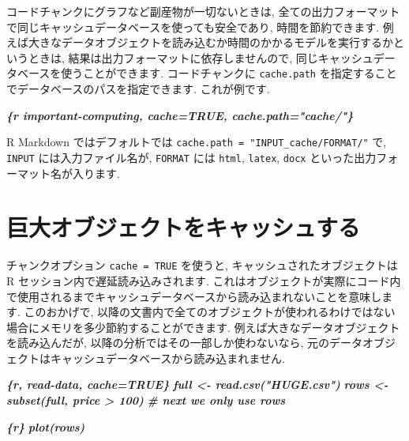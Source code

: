 \documentclass[
  11pt,
  lualatex,
  ja=standard]{bxjsreport}
\newenvironment{Shaded}{\begin{snugshade}}{\end{snugshade}}
\newcommand{\InformationTok}[1]{\textcolor[rgb]{0.56,0.35,0.01}{\textbf{\textit{#1}}}}
\begin{document}
コードチャンクにグラフなど副産物が一切ないときは, 全ての出力フォーマットで同じキャッシュデータベースを使っても安全であり, 時間を節約できます. 例えば大きなデータオブジェクトを読み込むか時間のかかるモデルを実行するかというときは, 結果は出力フォーマットに依存しませんので, 同じキャッシュデータベースを使うことができます. コードチャンクに \texttt{cache.path} を指定することでデータベースのパスを指定できます. これが例です.

\begin{Shaded}
\begin{Highlighting}[]
\InformationTok{\textasciigrave{}\textasciigrave{}\textasciigrave{}\{r important{-}computing, cache=TRUE, cache.path="cache/"\}}
\InformationTok{\textasciigrave{}\textasciigrave{}\textasciigrave{}}
\end{Highlighting}
\end{Shaded}

R Markdown ではデフォルトでは \texttt{cache.path = "INPUT\_cache/FORMAT/"} で, \texttt{INPUT} には入力ファイル名が, \texttt{FORMAT} には \texttt{html}, \texttt{latex}, \texttt{docx} といった出力フォーマット名が入ります.

\hypertarget{cache-lazy}{%
\section{巨大オブジェクトをキャッシュする}\label{cache-lazy}}

チャンクオプション \texttt{cache = TRUE} を使うと, キャッシュされたオブジェクトは R セッション内で遅延読み込みされます. これはオブジェクトが実際にコード内で使用されるまでキャッシュデータベースから読み込まれないことを意味します. このおかげで, 以降の文書内で全てのオブジェクトが使われるわけではない場合にメモリを多少節約することができます. 例えば大きなデータオブジェクトを読み込んだが, 以降の分析ではその一部しか使わないなら, 元のデータオブジェクトはキャッシュデータベースから読み込まれません.

\begin{Shaded}
\begin{Highlighting}[]
\InformationTok{\textasciigrave{}\textasciigrave{}\textasciigrave{}\{r, read{-}data, cache=TRUE\}}
\InformationTok{full \textless{}{-} read.csv("HUGE.csv")}
\InformationTok{rows \textless{}{-} subset(full, price \textgreater{} 100)}
\InformationTok{\# next we only use \textasciigrave{}rows\textasciigrave{}}
\InformationTok{\textasciigrave{}\textasciigrave{}\textasciigrave{}}

\InformationTok{\textasciigrave{}\textasciigrave{}\textasciigrave{}\{r\}}
\InformationTok{plot(rows)}
\InformationTok{\textasciigrave{}\textasciigrave{}\textasciigrave{}}
\end{Highlighting}
\end{Shaded}
\end{document}
